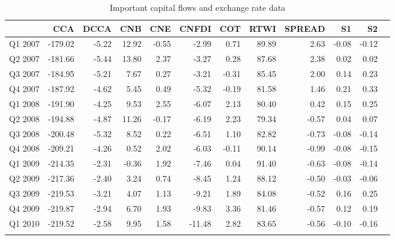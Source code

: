 \documentclass[12pt, a4paper, oneside]{article}\usepackage[]{graphicx}\usepackage[]{color}
\begin{document}
\begin{landscape}
\begin{table}[t]
\begin{threeparttable}
\caption{Important capital flows and exchange rate data}
\begin{tabular}{p{4cm}rrrrrrrrrrr}	
   \hline
 & CCA & DCCA & CNB & CNE & CNFDI & COT & RTWI & SPREAD & S1 & S2 \\ 
  \hline
Q1 2007  & -179.02 & -5.22 & 12.92 & -0.55 & -2.99 & 0.71 & 89.89 & 2.63 & -0.08 & -0.12 \\ 
Q2 2007  & -181.66 & -5.44 & 13.80 & 2.37 & -3.27 & 0.28 & 87.68 & 2.38 & 0.02 & 0.02 \\ 
Q3 2007  & -184.95 & -5.21 & 7.67 & 0.27 & -3.21 & -0.31 & 85.45 & 2.00 & 0.14 & 0.23 \\ 
Q4 2007 & -187.92 & -4.62 & 5.45 & 0.49 & -5.32 & -0.19 & 81.58 & 1.46 & 0.21 & 0.33 \\ 
Q1 2008  & -191.90 & -4.25 & 9.53 & 2.55 & -6.07 & 2.13 & 80.40 & 0.42 & 0.15 & 0.25 \\ 
Q2 2008  & -194.88 & -4.87 & 11.26 & -0.17 & -6.19 & 2.23 & 79.34 & -0.57 & 0.04 & 0.07 \\ 
Q3 2008  & -200.48 & -5.32 & 8.52 & 0.22 & -6.51 & 1.10 & 82.82 & -0.73 & -0.08 & -0.14 \\ 
Q4 2008  & -209.21 & -4.26 & 0.52 & 2.02 & -6.03 & -0.11 & 90.14 & -0.99 & -0.08 & -0.15 \\ 
Q1 2009 & -214.35 & -2.31 & -0.36 & 1.92 & -7.46 & 0.04 & 91.40 & -0.63 & -0.08 & -0.14 \\ 
Q2 2009  & -217.36 & -2.40 & 3.24 & 0.74 & -8.45 & 1.24 & 88.12 & -0.50 & -0.03 & -0.06 \\ 
Q3 2009  & -219.53 & -3.21 & 4.07 & 1.13 & -9.21 & 1.89 & 84.08 & -0.52 & 0.16 & 0.25 \\ 
Q4 2009 & -219.87 & -2.94 & 6.70 & 1.93 & -9.83 & 3.36 & 81.46 & -0.57 & 0.12 & 0.19 \\ 
Q1 2010 & -219.52 & -2.58 & 9.95 & 1.58 & -11.48 & 2.82 & 83.65 & -0.56 & -0.10 & -0.16 \\ 
   \hline
\label{tab:capflow}
\end{tabular}
\begin{tablenotes}
\small

\end{tablenotes}
\end{threeparttable}
\end{table}
\end{landscape}
\end{document}
